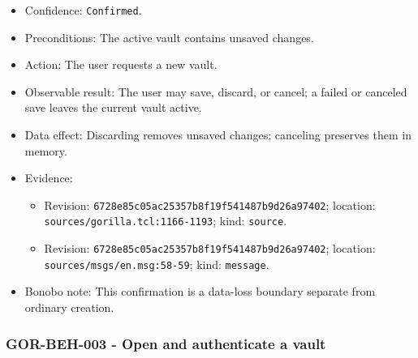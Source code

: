 \documentclass[
  letterpaper,
]{article}
\newcommand{\passthrough}[1]{#1}
\providecommand{\tightlist}{%
  \setlength{\itemsep}{0pt}\setlength{\parskip}{0pt}}
\begin{document}
\begin{itemize}
\tightlist
\item
  Confidence: \passthrough{\lstinline!Confirmed!}.
\item
  Preconditions: The active vault contains unsaved changes.
\item
  Action: The user requests a new vault.
\item
  Observable result: The user may save, discard, or cancel; a failed or canceled save leaves the current vault active.
\item
  Data effect: Discarding removes unsaved changes; canceling preserves them in memory.
\item
  Evidence:

  \begin{itemize}
  \tightlist
  \item
    Revision: \nolinkurl{6728e85c05ac25357b8f19f541487b9d26a97402}; location: \nolinkurl{sources/gorilla.tcl:1166-1193};
    kind: \passthrough{\lstinline!source!}.
  \item
    Revision: \nolinkurl{6728e85c05ac25357b8f19f541487b9d26a97402}; location: \nolinkurl{sources/msgs/en.msg:58-59};
    kind: \passthrough{\lstinline!message!}.
  \end{itemize}
\item
  Bonobo note: This confirmation is a data-loss boundary separate from ordinary creation.
\end{itemize}

\subsubsection{GOR-BEH-003 - Open and authenticate a vault}\label{gor-beh-003---open-and-authenticate-a-vault}
\end{document}
